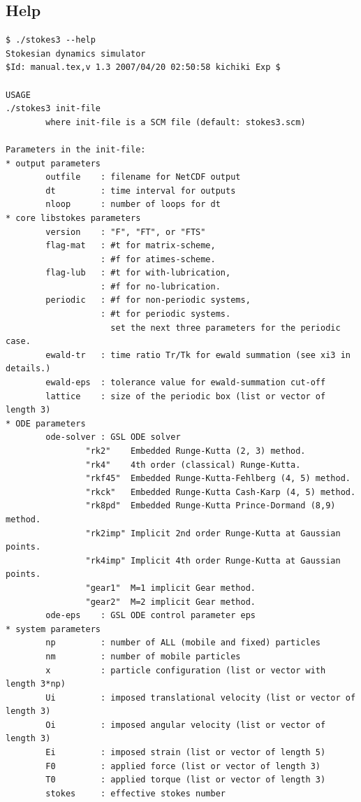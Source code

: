\documentclass{book}
\begin{document}
\subsection{Help}
{\small
\begin{verbatim}
$ ./stokes3 --help
Stokesian dynamics simulator
$Id: manual.tex,v 1.3 2007/04/20 02:50:58 kichiki Exp $

USAGE
./stokes3 init-file
        where init-file is a SCM file (default: stokes3.scm)

Parameters in the init-file:
* output parameters
        outfile    : filename for NetCDF output
        dt         : time interval for outputs
        nloop      : number of loops for dt
* core libstokes parameters
        version    : "F", "FT", or "FTS"
        flag-mat   : #t for matrix-scheme,
                   : #f for atimes-scheme.
        flag-lub   : #t for with-lubrication,
                   : #f for no-lubrication.
        periodic   : #f for non-periodic systems,
                   : #t for periodic systems.
                     set the next three parameters for the periodic case.
        ewald-tr   : time ratio Tr/Tk for ewald summation (see xi3 in details.)
        ewald-eps  : tolerance value for ewald-summation cut-off
        lattice    : size of the periodic box (list or vector of length 3)
* ODE parameters
        ode-solver : GSL ODE solver
                "rk2"    Embedded Runge-Kutta (2, 3) method.
                "rk4"    4th order (classical) Runge-Kutta.
                "rkf45"  Embedded Runge-Kutta-Fehlberg (4, 5) method.
                "rkck"   Embedded Runge-Kutta Cash-Karp (4, 5) method.
                "rk8pd"  Embedded Runge-Kutta Prince-Dormand (8,9) method.
                "rk2imp" Implicit 2nd order Runge-Kutta at Gaussian points.
                "rk4imp" Implicit 4th order Runge-Kutta at Gaussian points.
                "gear1"  M=1 implicit Gear method.
                "gear2"  M=2 implicit Gear method.
        ode-eps    : GSL ODE control parameter eps
* system parameters
        np         : number of ALL (mobile and fixed) particles
        nm         : number of mobile particles
        x          : particle configuration (list or vector with length 3*np)
        Ui         : imposed translational velocity (list or vector of length 3)
        Oi         : imposed angular velocity (list or vector of length 3)
        Ei         : imposed strain (list or vector of length 5)
        F0         : applied force (list or vector of length 3)
        T0         : applied torque (list or vector of length 3)
        stokes     : effective stokes number

\end{verbatim}}
\end{document}
